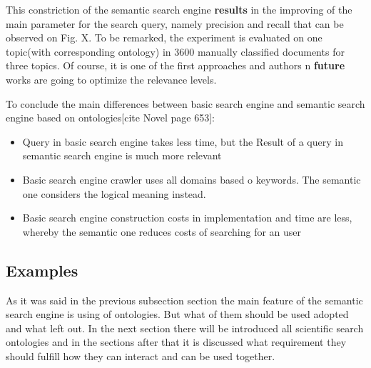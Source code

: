 		This constriction of the semantic search engine \textbf{results} in the improving of the main parameter for the search query, namely precision and recall that can be observed on Fig. X. To be remarked, the experiment is evaluated on one topic(with corresponding ontology) in  3600 manually classified documents for three topics. Of course, it is one of the first approaches and authors n \textbf{future} works are going to optimize the relevance levels.
		
		To conclude the main differences between basic search engine and semantic search engine based on ontologies[cite Novel page 653]:
			\begin{itemize}
				\item Query in basic search engine takes less time, but the  Result of a query in semantic search engine is much more relevant
				\item Basic search engine crawler uses all domains based o keywords. The semantic one considers the logical meaning instead. 
				\item Basic search engine construction costs in implementation and time are less, whereby the semantic one reduces costs of searching for an user   
			\end{itemize} 
		\subsection{Examples}
		As it was said in the previous subsection section the main feature of the semantic search engine is using of ontologies. But what of them should be used adopted and what left out. In the next section there will be introduced all scientific search ontologies \frqq and in the sections after that it is discussed what requirement they should fulfill how they can interact and can be used together.
		
